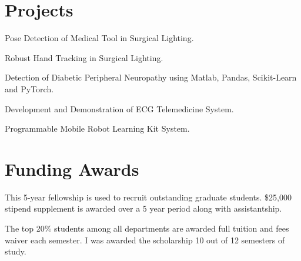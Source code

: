 \begin{minipage}[t]{0.675\textwidth}
\sectionspace %
\section{Projects}
\vspace{\topsep}
\begin{tightitemize}
\item Pose Detection of Medical Tool in Surgical Lighting. \href{https://github.com/Abdul-Mukit/dope_with_hand_tracking}{\faCode}
\item Robust Hand Tracking in Surgical Lighting. \href{https://github.com/Abdul-Mukit/robust_hand_tracking}{\faCode}
\item Detection of Diabetic Peripheral Neuropathy using Matlab, Pandas, Scikit-Learn and PyTorch. \href{https://github.com/Abdul-Mukit/Microvascular}{\faCode}
\item Development and Demonstration of ECG Telemedicine System. \href{https://ieeexplore.ieee.org/document/7083548}{\faChain}
\item Programmable Mobile Robot Learning Kit System.
\end{tightitemize}

\sectionspace %
\section{Funding Awards}
This 5-year fellowship is used to recruit outstanding graduate students. \$25,000 stipend supplement is awarded over a 5 year period along with assistantship.
\sectionspace %

The top 20\% students among all departments are awarded full tuition and fees waiver each semester. I was awarded the scholarship 10 out of 12 semesters of study.
\sectionspace %

\end{minipage} %
\vspace*{\fill}
\center{\textcolor{gray}{2/2}}